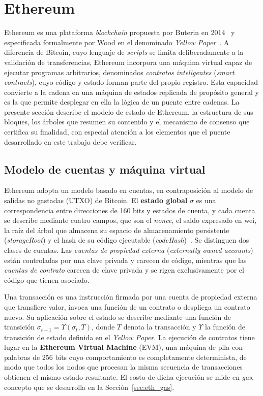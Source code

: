 \section{Ethereum}
\label{sec:ethereum}

Ethereum es una plataforma \textit{blockchain} propuesta por Buterin en
2014~\cite{buterin2014ethereum} y especificada formalmente por Wood en el denominado
\textit{Yellow Paper}~\cite{wood2014ethereum}. A diferencia de Bitcoin, cuyo lenguaje de
\textit{scripts} se limita deliberadamente a la validación de transferencias, Ethereum incorpora
una máquina virtual capaz de ejecutar programas arbitrarios, denominados \textit{contratos
inteligentes} (\textit{smart contracts}), cuyo código y estado forman parte del propio registro.
Esta capacidad convierte a la cadena en una máquina de estados replicada de propósito general y
es la que permite desplegar en ella la lógica de un puente entre cadenas. La presente sección
describe el modelo de estado de Ethereum, la estructura de sus bloques, los árboles que resumen
su contenido y el mecanismo de consenso que certifica su finalidad, con especial atención a los
elementos que el puente desarrollado en este trabajo debe verificar.

\subsection{Modelo de cuentas y máquina virtual}
\label{sec:eth_cuentas}

Ethereum adopta un modelo basado en cuentas, en contraposición al modelo de salidas no gastadas
(UTXO) de Bitcoin. El \textbf{estado global} $\sigma$ es una correspondencia entre direcciones de
160 bits y estados de cuenta, y cada cuenta se describe mediante cuatro campos, que son el
\textit{nonce}, el saldo expresado en wei, la raíz del árbol que almacena su espacio de
almacenamiento persistente (\textit{storageRoot}) y el hash de su código ejecutable
(\textit{codeHash})~\cite{wood2014ethereum}. Se distinguen dos clases de cuentas. Las
\textit{cuentas de propiedad externa} (\textit{externally owned accounts}) están controladas por
una clave privada y carecen de código, mientras que las \textit{cuentas de contrato} carecen de
clave privada y se rigen exclusivamente por el código que tienen asociado.

Una transacción es una instrucción firmada por una cuenta de propiedad externa que transfiere
valor, invoca una función de un contrato o despliega un contrato nuevo. Su aplicación sobre el
estado se describe mediante una función de transición $\sigma_{t+1} = \Upsilon(\sigma_t, T)$,
donde $T$ denota la transacción y $\Upsilon$ la función de transición de estado definida en el
\textit{Yellow Paper}. La ejecución de contratos tiene lugar en la \textbf{Ethereum Virtual
Machine} (EVM), una máquina de pila con palabras de 256 bits cuyo comportamiento es
completamente determinista, de modo que todos los nodos que procesan la misma secuencia de
transacciones obtienen el mismo estado resultante. El costo de dicha ejecución se mide en
\textit{gas}, concepto que se desarrolla en la Sección~\ref{sec:eth_gas}.


